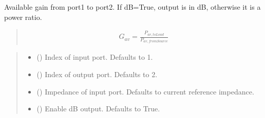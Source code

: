 \documentclass[letterpaper,10pt,english]{sphinxmanual}
\begin{document}
\begin{fulllineitems}
\begin{fulllineitems}
\label{\detokenize{touchstone:touchstone.spfile.gav}}
\pysigstartsignatures
{}
\pysigstopsignatures
\sphinxAtStartPar
Available gain from port1 to port2. If dB=True, output is in dB, otherwise it is a power ratio.
\begin{quote}
\begin{equation*}
\begin{split}G_{av}=\frac{P_{av,toLoad}}{P_{av,fromSource}}\end{split}
\end{equation*}\end{quote}
\begin{quote}\begin{description}
\begin{itemize}
\item {}
\sphinxAtStartPar
{} (\sphinxstyleliteralemphasis{\sphinxupquote{, }}) \textendash{} Index of input port. Defaults to 1.

\item {}
\sphinxAtStartPar
{} (\sphinxstyleliteralemphasis{\sphinxupquote{, }}) \textendash{} Index of output port. Defaults to 2.

\item {}
\sphinxAtStartPar
{} (\sphinxstyleliteralemphasis{\sphinxupquote{, }}) \textendash{} Impedance of input port. Defaults to current reference impedance.

\item {}
\sphinxAtStartPar
{} (\sphinxstyleliteralemphasis{\sphinxupquote{, }}) \textendash{} Enable dB output. Defaults to True.


\end{itemize}
\end{description}
\end{quote}
\end{fulllineitems}
\end{fulllineitems}
\end{document}
